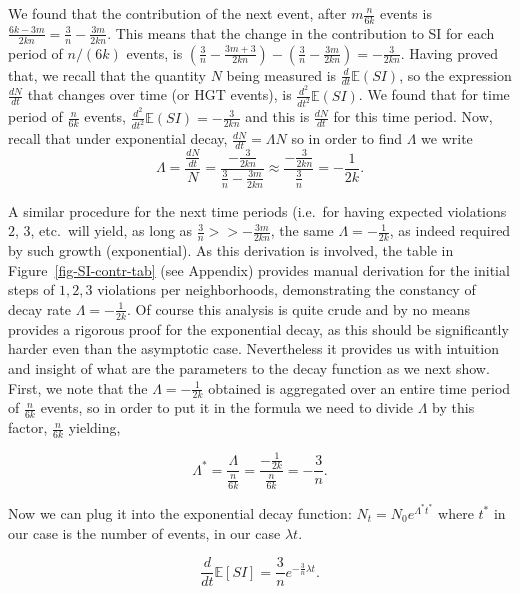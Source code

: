 \documentclass[runningheads, 11pt]{llncs}
\newcommand{\EE}{\mathbb{E}}
\begin{document}
We found that the contribution of the next event, after $m\frac n{6k}$ events is
$\frac {6k-3m}{2kn} = \frac 3n-\frac{3m}{2kn}$. This means that the change in
the contribution to SI for each period of $n/(6k)$ events, is $ \left (\frac
3n-\frac{3m+3}{2kn}\right )-\left ( \frac 3n-\frac{3m}{2kn}\right ) =
-\frac{3}{2kn}$. Having proved that, we recall that the quantity $N$ being
measured is $\frac d{dt}\EE(SI)$, so the expression $\frac {d N}{dt}$ that
changes over time (or HGT events), is $\frac {d^2}{dt^2}\EE(SI)$. We found that
for time period of $\frac n{6k}$ events, $\frac{d^2}{dt^2}\EE(SI) = -
\frac{3}{2kn}$ and this is $\frac{d N}{dt}$ for this time period. Now, recall
that under exponential decay, $\frac{d N}{dt} = \Lambda N$ so in order to find
$\Lambda$ we write 
\begin{equation}
\Lambda = \frac{\frac {d N}{dt}}{N} = \frac {-\frac 3{2kn}}{\frac
3n-\frac{3m}{2kn}} \approx \frac {-\frac {3}{2kn}}{\frac 3n} = -\frac 1{2k}.
\end{equation}

A similar procedure for the next time periods (i.e.\ for having expected
violations $2$, $3$, etc.\ will yield, as long as $\frac 3n >> -\frac{3m}{2kn}$,
the same $\Lambda = -\frac 1{2k}$, as indeed required by such growth
(exponential). As this derivation is involved, the table in
Figure~\ref{fig-SI-contr-tab} (see Appendix) provides manual derivation for the
initial steps of $1,2,3$ violations per neighborhoods, demonstrating the
constancy of decay rate $\Lambda = -\frac 1{2k}$. Of course this analysis is
quite crude and by no means provides a rigorous proof for the exponential decay,
as this should be significantly harder even than the asymptotic case.
Nevertheless it provides us with intuition and insight of what are the
parameters to the decay function as we next show. First, we note that the
$\Lambda = -\frac 1{2k}$ obtained is aggregated over an entire time period of
$\frac n{6k}$ events, so in order to put it in the formula we need to divide
$\Lambda $ by this factor, $\frac n{6k}$ yielding,

\begin{equation}
\Lambda^* = \frac \Lambda {\frac n{6k}} = \frac {-\frac 1{2k}}{\frac
 n{6k}} = -\frac 3n.
\end{equation}

Now we can plug it into the exponential decay function: $N_t=N_0e^{\Lambda^*
t^*}$ where $t^*$ in our case is the number of events, in our case $\lambda t$.

\begin{equation}
\label{eq-E-SI'}
\frac d{dt}\EE[SI]=\frac 3ne^{-\frac 3n\lambda t}.
\end{equation}
\end{document}
